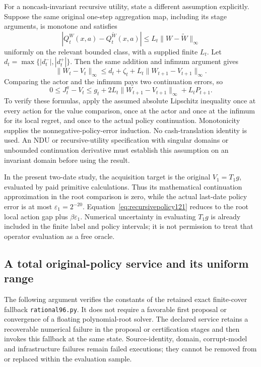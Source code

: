 For a noncash-invariant recursive utility,
state a different assumption explicitly.
Suppose the same original one-step
aggregation map, including its stage
arguments, is monotone and satisfies
\[
 |Q_t^W(x,a)-Q_t^{\widetilde W}(x,a)|
       \leq L_t\|W-\widetilde W\|_\infty
\]
uniformly on the relevant bounded class,
with a supplied finite \(L_t\).
Let \(d_t=\max\{|d_t^-|,|d_t^+|\}\).
Then the same addition and infimum
argument gives
\[
 \|W_t-V_t\|_\infty
      \leq d_t+\zeta_t+
                       L_t\|W_{t+1}-V_{t+1}\|_\infty.
\]
Comparing the actor and the infimum pays
two continuation errors, so
\[
 0\leq J_t^\pi-V_t
 \leq g_t+2L_t\|W_{t+1}-V_{t+1}\|_\infty
                          +L_tP_{t+1}.
\]
To verify these formulas, apply the
assumed absolute Lipschitz inequality
once at every action for the value
comparison, once at the actor and once
at the infimum for its local regret,
and once to the actual policy
continuation.  Monotonicity supplies the
nonnegative-policy-error induction.
No cash-translation identity is used.
An NDU or recursive-utility specification
with singular domains or unbounded
continuation derivative must establish
this assumption on an invariant domain
before using the result.

In the present two-date study, the
acquisition target is the original
\(V_1=T_1g\), evaluated by paid
primitive calculations.  Thus its
mathematical continuation approximation
in the root comparison is zero, while
the actual last-date policy error is
at most \(\varepsilon_1=2^{-20}\).
Equation~\eqref{eq:recursivepolicy121}
reduces to the root local action gap
plus \(\beta\varepsilon_1\).
Numerical uncertainty in evaluating
\(T_1g\) is already included in the
finite label and policy intervals;
it is not permission to treat that
operator evaluation as a free oracle.

\subsection{A total original-policy service and its uniform range}
\label{supp:totalservice121}

The following argument verifies the constants of the retained
exact finite-cover fallback \texttt{rational96.py}.
It does not require a favorable first proposal or convergence
of a floating polynomial-root solver.
The declared service retains a recoverable numerical failure
in the proposal or certification stages and then invokes this
fallback at the same state.  Source-identity, domain,
corrupt-model and infrastructure failures remain failed
executions; they cannot be removed from or replaced within
the evaluation sample.

